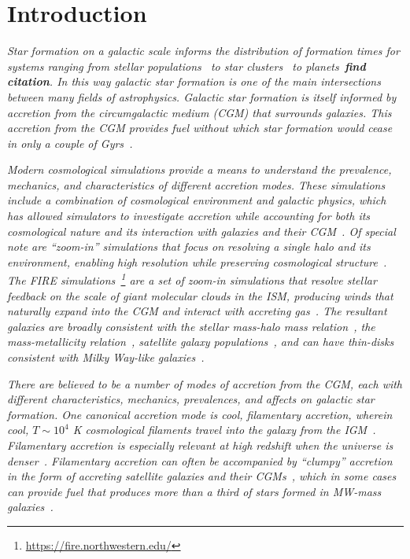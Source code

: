 \documentclass[fleqn,usenatbib]{mnras}
\begin{document}
\section{Introduction}
\label{s: introduction}

\textit{
Star formation on a galactic scale informs the distribution of formation times for systems ranging from stellar populations~\cite{Yu2021} to star clusters~\citep[e.g.][]{Grudic2020} to planets~\textbf{find citation}.
In this way galactic star formation is one of the main intersections between many fields of astrophysics.
Galactic star formation is itself informed by accretion from the circumgalactic medium (CGM) that surrounds galaxies.
This accretion from the CGM provides fuel without which star formation would cease in only a couple of Gyrs~\cite[e.g.][]{Prochaska2009, Bauermeister2010, Spring2017}.
}

\textit{
Modern cosmological simulations provide a means to understand the prevalence, mechanics, and characteristics of different accretion modes.
These simulations include a combination of cosmological environment and galactic physics, which has allowed simulators to investigate accretion while accounting for both its cosmological nature and its interaction with galaxies and their CGM~\citep[e.g.][Trapp et al,. in prep.]{Oppenheimer2010, Stewart2011, Fernandez2012, Ford2014, Angles-Alcazar2017, Hafen2019, Hafen2020, Ho2019, Rottgers2020}.
Of special note are ``zoom-in'' simulations that focus on resolving a single halo and its environment, enabling high resolution while preserving cosmological structure~\citep[e.g.][]{Katz1993, Hopkins2014, Hopkins2018, Wang2015, Agertz2020}.
The FIRE simulations~\citep{Hopkins2014, Hopkins2017}\footnote{\url{https://fire.northwestern.edu/}} are a set of zoom-in simulations that resolve stellar feedback on the scale of giant molecular clouds in the ISM, producing winds that naturally expand into the CGM and interact with accreting gas~\citep{Muratov2015,Muratov2016, Hafen2019, Hafen2020}.
The resultant galaxies are broadly consistent with the stellar mass-halo mass relation~\citep{Hopkins2017}, the mass-metallicity relation~\citep{Ma2015}, satellite galaxy populations~\citep{Wetzel2016,Garrison-Kimmel2019a}, and can have thin-disks consistent with Milky Way-like galaxies~\cite{Garrison-Kimmel2018, El-Badry2018}.
}

\textit{
There are believed to be a number of modes of accretion from the CGM, each with different characteristics, mechanics, prevalences, and affects on galactic star formation.
One canonical accretion mode is cool, filamentary accretion, wherein cool, $T \sim 10^4$ K cosmological filaments travel into the galaxy  from the IGM~\cite[e.g.][]{Keres2005, Dekel2006, Keres2009, Martin2019a}.
Filamentary accretion is especially relevant at high redshift when the universe is denser~\citep[e.g.][]{Keres2009a, Stern2019, Huscher2020}.
Filamentary accretion can often be accompanied by ``clumpy'' accretion in the form of accreting satellite galaxies and their CGMs~\citep[e.g.][]{Hafen2019, Hafen2020}, which in some cases can provide fuel that produces more than a third of stars formed in MW-mass galaxies~\citep{Angles-Alcazar2017}.
}
\end{document}
